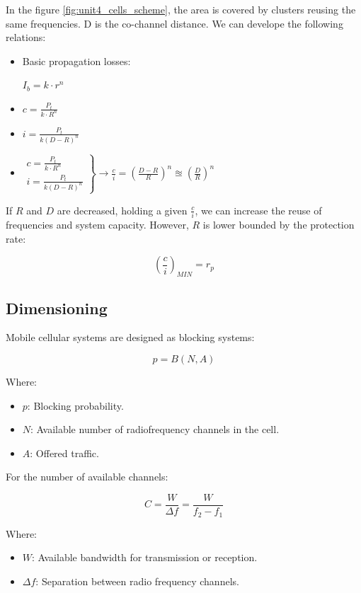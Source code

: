 \documentclass[
	12pt,
	twoside
]{book}
\begin{document}
In the figure \ref{fig:unit4_cells_scheme}, the area is covered by clusters reusing the same frequencies. D is the co-channel distance. We can develope the following relations:

\begin{itemize}
	\item {
		Basic propagation losses:

		$I_b = k \cdot r^n$
	}
	\item {
		$c = \frac {P_t} {k \cdot R^n}$
	}
	\item {
		$i = \frac {P_t} {k (D - R)^n}$
	}
	\item {
		$
			\left.
				\begin{matrix}
					c = \frac {P_t} {k \cdot R^n} \\
					i = \frac {P_t} {k (D - R)^n}
				\end{matrix}
			\right\rbrace \rightarrow
			\frac {c} {i} = \left( \frac {D - R} {R} \right)^n \approxeq \left( \frac {D} {R} \right)^n
		$
	}
\end{itemize}

If $R$ and $D$ are decreased, holding a given $\frac {c} {i}$, we can increase the reuse of frequencies and system capacity. However, $R$ is lower bounded by the protection rate:

$$\left( \frac {c} {i} \right)_{MIN} = r_p$$

\subsection{Dimensioning}

Mobile cellular systems are designed as blocking systems:

$$
	p = B(N, A)
$$

Where:
\begin{itemize}
	\item $p$: Blocking probability.
	\item $N$: Available number of radiofrequency channels in the cell.
	\item $A$: Offered traffic.
\end{itemize}

For the number of available channels:

$$
	C = \frac {W} {\Delta f} = \frac {W} {f_2 -  f_1}
$$

Where:
\begin{itemize}
	\item $W$: Available bandwidth for transmission or reception.
	\item $\Delta f$: Separation between radio frequency channels.
\end{itemize}
\end{document}
